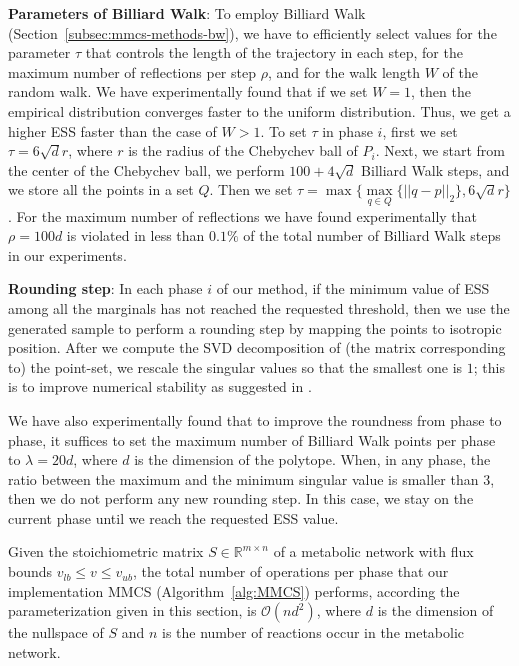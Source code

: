   \textbf{Parameters of Billiard Walk}: 
   To employ Billiard Walk (Section~\ref{subsec:mmcs-methods-bw}), we have to efficiently select values for the parameter $\tau$ that controls the length of the trajectory in each step, 
   for the maximum number of reflections per step $\rho$, and for the walk length $W$
   of the random walk. 
   We have experimentally found that if we set $W=1$, then  the empirical
   distribution converges faster to the uniform distribution. 
   Thus, we get a higher ESS faster than the case of $W>1$. To set $\tau$ in phase $i$, 
   first we set $\tau = 6\sqrt{d}r$, 
   where $r$ is the radius of the Chebychev ball of $P_i$.
   Next, we start from the center of the Chebychev ball, we perform
   $100 + 4\sqrt{d}$ Billiard Walk steps, and we store all the points in a set
   $Q$. Then we set
   $\tau = \max\{ \max\limits_{q\in Q}\{ ||q-p||_2 \}, 6\sqrt{d}r\}$. 
   For the maximum number of reflections we have found experimentally that
   $\rho = 100d$ is violated in less than $0.1\%$ of the total number of Billiard
   Walk steps in our experiments.


   \textbf{Rounding step}: 
   In each phase $i$ of our method, if the minimum value of
   ESS among all the marginals has not reached the requested threshold, then we use
   the generated sample to perform a rounding step by mapping the points to
   isotropic position. 
   After we compute the SVD decomposition of (the matrix corresponding to) the point-set, 
   we rescale the singular values so that the smallest one is $1$; 
   this is to improve numerical stability as suggested in \citep{Cousins15}.

   We have also experimentally found that to improve the roundness from phase to
   phase, it suffices to set the maximum number of Billiard Walk points per phase to
   $\lambda = 20d$, where $d$ is the dimension of the polytope. When, in any phase,
   the ratio between the maximum and the minimum singular value is smaller than
   $3$, then we do not perform any new rounding step. In this case, we stay on the
   current phase until we reach the requested ESS value.

   \begin{remark}
      Given the stoichiometric matrix
      $S\in\mathbb{R}^{m\times n}$ of a metabolic network with 
      flux bounds $v_{lb}\leq v\leq v_{ub}$, the total number of operations per phase that our implementation MMCS (Algorithm~\ref{alg:MMCS}) performs, according the parameterization given in this section, is $\mathcal{O}(nd^2)$, where $d$ is the dimension of the nullspace of $S$ and $n$ is the number of reactions occur in the metabolic network.
   \end{remark}
 
